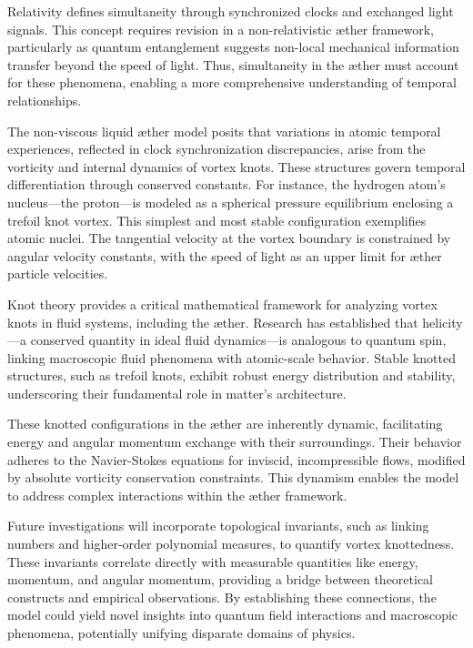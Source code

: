 \documentclass[a4paper,10pt]{article}
\begin{document}
    Relativity defines simultaneity through synchronized clocks and exchanged light signals. This concept requires revision in a non-relativistic æther framework, particularly as quantum entanglement suggests non-local mechanical information transfer beyond the speed of light. Thus, simultaneity in the æther must account for these phenomena, enabling a more comprehensive understanding of temporal relationships.

    The non-viscous liquid æther model posits that variations in atomic temporal experiences, reflected in clock synchronization discrepancies, arise from the vorticity and internal dynamics of vortex knots. These structures govern temporal differentiation through conserved constants. For instance, the hydrogen atom’s nucleus—the proton—is modeled as a spherical pressure equilibrium enclosing a trefoil knot vortex. This simplest and most stable configuration exemplifies atomic nuclei. The tangential velocity at the vortex boundary is constrained by angular velocity constants, with the speed of light as an upper limit for æther particle velocities.

    Knot theory provides a critical mathematical framework for analyzing vortex knots in fluid systems, including the æther. Research has established that helicity—a conserved quantity in ideal fluid dynamics—is analogous to quantum spin, linking macroscopic fluid phenomena with atomic-scale behavior. Stable knotted structures, such as trefoil knots, exhibit robust energy distribution and stability, underscoring their fundamental role in matter’s architecture.

    These knotted configurations in the æther are inherently dynamic, facilitating energy and angular momentum exchange with their surroundings. Their behavior adheres to the Navier-Stokes equations for inviscid, incompressible flows, modified by absolute vorticity conservation constraints. This dynamism enables the model to address complex interactions within the æther framework.

    Future investigations will incorporate topological invariants, such as linking numbers and higher-order polynomial measures, to quantify vortex knottedness. These invariants correlate directly with measurable quantities like energy, momentum, and angular momentum, providing a bridge between theoretical constructs and empirical observations. By establishing these connections, the model could yield novel insights into quantum field interactions and macroscopic phenomena, potentially unifying disparate domains of physics.
\end{document}
